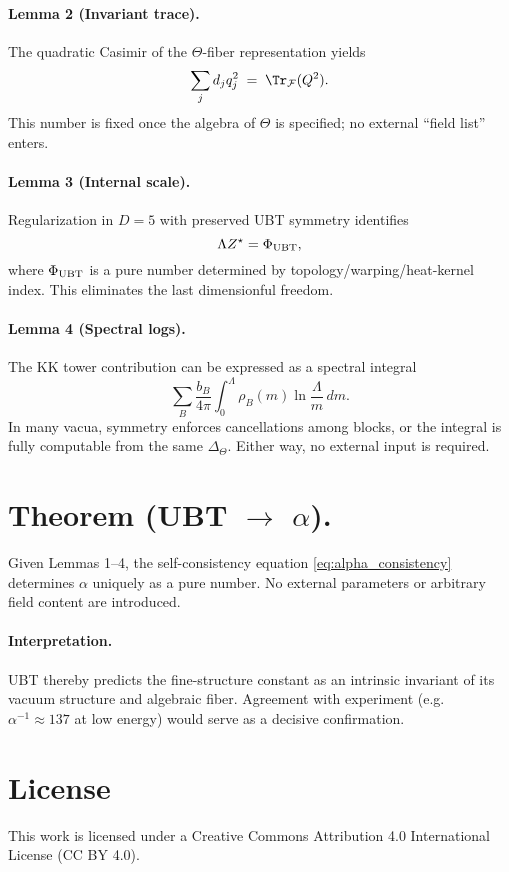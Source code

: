 \documentclass[12pt]{article}
\begin{document}
\paragraph{Lemma 2 (Invariant trace).}
The quadratic Casimir of the $\Theta$-fiber representation yields
\begin{equation}
\sum_j d_j q_j^2 \;=\; \Tr_{\mathcal F}(Q^2).
\end{equation}
This number is fixed once the algebra of $\Theta$ is specified; no external ``field list'' enters.

\paragraph{Lemma 3 (Internal scale).}
Regularization in $D=5$ with preserved UBT symmetry identifies
\begin{equation}
\Lambda Z^\star = \Phi_{\rm UBT},
\end{equation}
where $\Phi_{\rm UBT}$ is a pure number determined by topology/warping/heat-kernel index. This eliminates the last dimensionful freedom.

\paragraph{Lemma 4 (Spectral logs).}
The KK tower contribution can be expressed as a spectral integral
\begin{equation}
\sum_B \frac{b_B}{4\pi}\!\int_0^{\Lambda}\rho_B(m)\ln\!\frac{\Lambda}{m}\,dm.
\end{equation}
In many vacua, symmetry enforces cancellations among blocks, or the integral is fully computable from the same $\Delta_\Theta$. Either way, no external input is required.

\section*{Theorem (UBT $\to$ $\alpha$).}
Given Lemmas 1--4, the self-consistency equation \eqref{eq:alpha_consistency} determines $\alpha$ uniquely as a pure number.
No external parameters or arbitrary field content are introduced.

\paragraph{Interpretation.}
UBT thereby predicts the fine-structure constant as an intrinsic invariant of its vacuum structure and algebraic fiber. 
Agreement with experiment (e.g.\ $\alpha^{-1}\approx137$ at low energy) would serve as a decisive confirmation.


\section*{License}
This work is licensed under a Creative Commons Attribution 4.0 International License (CC BY 4.0).
\end{document}
